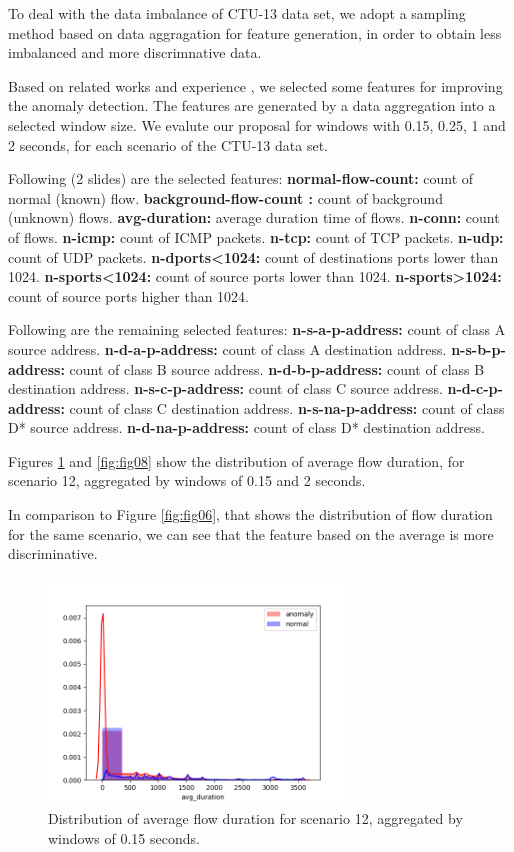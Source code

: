 \documentclass[review]{elsarticle}
\begin{document}
To deal with the data imbalance of CTU-13 data set, we adopt a sampling method based on data aggragation \cite{acarali2016survey} for feature generation, in order to obtain less imbalanced and more discrimnative data.	

Based on related works \cite{lakhina2005mining, callegari2011novel, chandrashekar2014survey, acarali2016survey} and experience \cite{vieira2017model, galibus2017offline}, we selected some features for improving the anomaly detection.
The features are generated by a data aggregation into a selected window size. We evalute our proposal for windows with 0.15, 0.25, 1 and 2 seconds, for each scenario of the CTU-13 data set.
	
Following (2 slides) are the selected features:
\textbf{normal-flow-count:} count of normal (known) flow.
\textbf{background-flow-count :} count of background (unknown) flows.
\textbf{avg-duration:} average duration time of flows.
\textbf{n-conn:} count of flows.
\textbf{n-icmp:} count of ICMP packets.
\textbf{n-tcp:} count of TCP packets.
\textbf{n-udp:} count of UDP packets.
\textbf{n-dports<1024:} count of destinations ports lower than 1024.
\textbf{n-sports<1024:} count of source ports lower than 1024.
\textbf{n-sports>1024:} count of source ports higher than 1024.

Following are the remaining selected features:
\textbf{n-s-a-p-address:} count of class A source address.
\textbf{n-d-a-p-address:} count of class A destination address.
\textbf{n-s-b-p-address:} count of class B source address.
\textbf{n-d-b-p-address:} count of class B destination address.
\textbf{n-s-c-p-address:} count of class C source address.
\textbf{n-d-c-p-address:} count of class C destination address.
\textbf{n-s-na-p-address:} count of class D* source address.
\textbf{n-d-na-p-address:} count of class D* destination address.

Figures \ref{fig:fig07} and \ref{fig:fig08} show the distribution of average flow duration, for scenario 12, aggregated by windows of 0.15 and 2 seconds.

In comparison to Figure \ref{fig:fig06}, that shows the distribution of flow duration for the same scenario, we can see that the feature based on the average is more discriminative.

\begin{figure}[h!]
     \centering
     \includegraphics[width=8cm]{figures/agg_distplot_0_15s_12_avg_duration.png}
     \caption{Distribution of average flow duration for scenario 12, aggregated by windows of 0.15 seconds.}
     \label{fig:fig07}
\end{figure}
\end{document}
